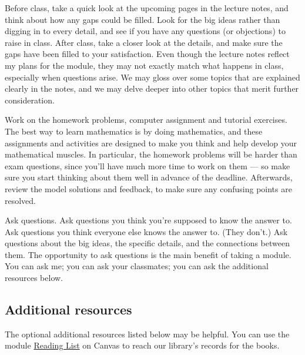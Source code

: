 Before class, take a quick look at the upcoming pages in the lecture notes, and think about how any gaps could be filled.
Look for the big ideas rather than digging in to every detail, and see if you have any questions (or objections) to raise in class.
After class, take a closer look at the details, and make sure the gaps have been filled to your satisfaction.
Even though the lecture notes reflect my plans for the module, they may not exactly match what happens in class, especially when questions arise.
We may gloss over some topics that are explained clearly in the notes, and we may delve deeper into other topics that merit further consideration.

Work on the homework problems, computer assignment and tutorial exercises.
The best way to learn mathematics is by doing mathematics, and these assignments and activities are designed to make you think and help develop your mathematical muscles.
In particular, the homework problems will be harder than exam questions, since you'll have much more time to work on them --- so make sure you start thinking about them well in advance of the deadline.
Afterwards, review the model solutions and feedback, to make sure any confusing points are resolved.

Ask questions.
Ask questions you think you're supposed to know the answer to.
Ask questions you think everyone else knows the answer to.
(They don't.)
Ask questions about the big ideas, the specific details, and the connections between them.
The opportunity to ask questions is the main benefit of taking a module.
You can ask me; you can ask your classmates; you can ask the additional resources below.



\subsection*{Additional resources}
The optional additional resources listed below may be helpful.
You can use the module \href{https://canvas.liverpool.ac.uk/courses/76365/external_tools/102}{Reading List} on Canvas to reach our library's records for the books.

